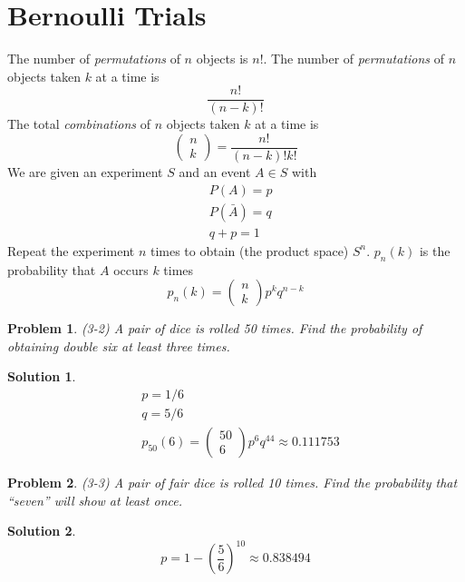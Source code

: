\documentclass{article}
\newtheorem{problem}{Problem}[section]
\newtheorem{solution}{Solution}[section]
\begin{document}
	\section{Bernoulli Trials}
		The number of \emph{permutations} of $n$ objects is $n!$. The number of \emph{permutations} of $n$ objects taken $k$ at a time is
		\begin{equation}
			\frac{n!}{(n-k)!}
		\end{equation}
		The total \emph{combinations} of $n$ objects taken $k$ at a time is
		\begin{equation}
			\begin{pmatrix}
				n\\
				k
			\end{pmatrix}
			=\frac{n!}{(n-k)!k!}
		\end{equation}
		We are given an experiment $S$ and an event $A\in S$ with
		\begin{align*}
			&P(A)=p\\
			&P(\bar{A})=q\\
			&q+p=1
		\end{align*}
		Repeat the experiment $n$ times to obtain (the product space) $S^n$. $p_n(k)$ is the probability that $A$ occurs $k$ times
		\begin{equation}
			p_n(k)=
			\begin{pmatrix}
				n\\
				k
			\end{pmatrix}
			p^kq^{n-k}
		\end{equation}
		\begin{problem}
			(3-2) A pair of dice is rolled 50 times. Find the probability of obtaining double six at least three times.
		\end{problem}
		\begin{solution}
			\begin{align*}
				&p=1/6\\
				&q=5/6\\
				&p_{50}(6)=
				\begin{pmatrix}
					50\\
					6
				\end{pmatrix}
				p^6q^{44}\approx 0.111753
			\end{align*}
		\end{solution}
		\begin{problem}
			(3-3) A pair of fair dice is rolled 10 times. Find the probability that ``seven'' will show at least once.
		\end{problem}
		\begin{solution}
			\begin{equation*}
				p=1-\left(\frac{5}{6}\right)^{10}\approx 0.838494
			\end{equation*}
		\end{solution}
\end{document}
